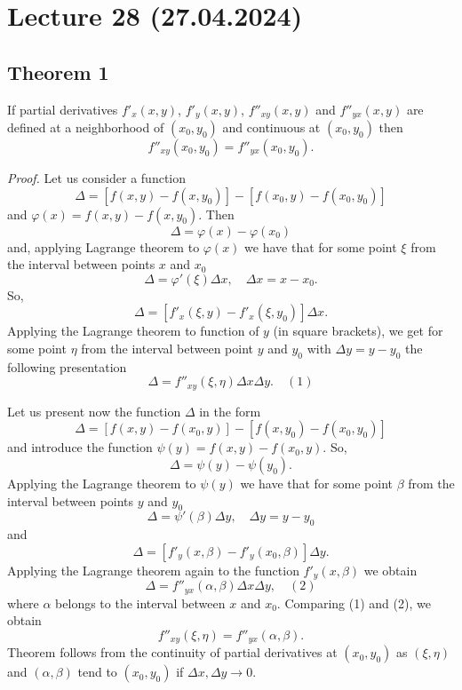 \documentclass{article}
\begin{document}
\section*{Lecture 28 (27.04.2024)}

\subsection*{Theorem 1}

\begin{theorem}
If partial derivatives $f'_x(x, y)$, $f'_y(x, y)$, $f''_{xy}(x, y)$ and $f''_{yx}(x, y)$ are defined at a neighborhood of $(x_0, y_0)$ and continuous at $(x_0, y_0)$ then
\[
f''_{xy}(x_0, y_0) = f''_{yx}(x_0, y_0).
\]
\end{theorem}

\vspace{1em}

\textit{Proof.} Let us consider a function
\[
\Delta = [f (x, y) - f (x, y_0)] - [f (x_0, y) - f (x_0, y_0)]
\]
and $\varphi(x) = f (x, y) - f (x, y_0)$. Then
\[
\Delta = \varphi(x) - \varphi(x_0)
\]
and, applying Lagrange theorem to $\varphi(x)$ we have that for some point $\xi$ from the interval between points $x$ and $x_0$
\[
\Delta = \varphi'(\xi)\Delta x, \quad \Delta x = x - x_0.
\]
So,
\[
\Delta = [f'_x (\xi, y) - f'_x (\xi, y_0)]\Delta x.
\]
Applying the Lagrange theorem to function of $y$ (in square brackets), we get for some point $\eta$ from the interval between point $y$ and $y_0$ with $\Delta y = y - y_0$ the following presentation
\[
\Delta = f''_{xy}(\xi, \eta)\Delta x \Delta y. \quad (1)
\]

Let us present now the function $\Delta$ in the form
\[
\Delta = [f (x, y) - f (x_0, y)] - [f (x, y_0) - f (x_0, y_0)]
\]
and introduce the function $\psi(y) = f (x, y) - f (x_0, y)$. So,
\[
\Delta = \psi(y) - \psi(y_0).
\]
Applying the Lagrange theorem to $\psi(y)$ we have that for some point $\beta$ from the interval between points $y$ and $y_0$
\[
\Delta = \psi'(\beta)\Delta y, \quad \Delta y = y - y_0
\]
and
\[
\Delta = [f'_y (x, \beta) - f'_y (x_0, \beta)]\Delta y.
\]
Applying the Lagrange theorem again to the function $f'_y (x, \beta)$ we obtain
\[
\Delta = f''_{yx}(\alpha, \beta)\Delta x \Delta y, \quad (2)
\]
where $\alpha$ belongs to the interval between $x$ and $x_0$. Comparing (1) and (2), we obtain
\[
f''_{xy}(\xi, \eta) = f''_{yx}(\alpha, \beta).
\]
Theorem follows from the continuity of partial derivatives at $(x_0, y_0)$ as $(\xi, \eta)$ and $(\alpha, \beta)$ tend to $(x_0, y_0)$ if $\Delta x, \Delta y \to 0$.
\end{document}
